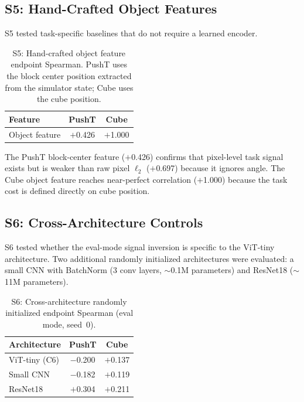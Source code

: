 \subsection{S5: Hand-Crafted Object Features}
\label{app:s5}

S5 tested task-specific baselines that do not require a learned encoder.

\begin{table}[h]
\centering
\caption{S5: Hand-crafted object feature endpoint Spearman.  PushT uses the
block center position extracted from the simulator state; Cube uses the cube
position.}
\label{tab:s5}
\begin{tabular}{lcc}
\toprule
Feature & PushT & Cube \\
\midrule
Object feature & $+$0.426 & $+$1.000 \\
\bottomrule
\end{tabular}
\end{table}

The PushT block-center feature ($+$0.426) confirms that pixel-level task
signal exists but is weaker than raw pixel $\ell_2$ ($+$0.697) because it
ignores angle.  The Cube object feature reaches near-perfect correlation
($+$1.000) because the task cost is defined directly on cube position.

\subsection{S6: Cross-Architecture Controls}
\label{app:s6}

S6 tested whether the eval-mode signal inversion is specific to the ViT-tiny
architecture.  Two additional randomly initialized architectures were evaluated:
a small CNN with BatchNorm (3 conv layers, $\sim$0.1M parameters) and
ResNet18 ($\sim$11M parameters).

\begin{table}[h]
\centering
\caption{S6: Cross-architecture randomly initialized endpoint Spearman (eval mode,
seed~0).}
\label{tab:s6}
\begin{tabular}{lcc}
\toprule
Architecture & PushT & Cube \\
\midrule
ViT-tiny (C6) & $-$0.200 & $+$0.137 \\
Small CNN & $-$0.182 & $+$0.119 \\
ResNet18 & $+$0.304 & $+$0.211 \\
\bottomrule
\end{tabular}
\end{table}


